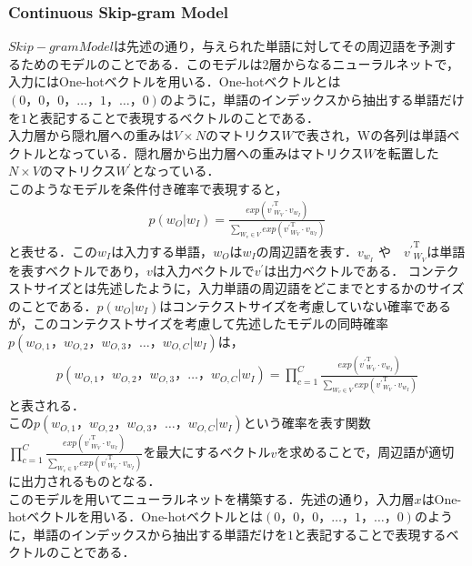 \subsubsection{Continuous Skip-gram Model}
\label{tech:skipgram}
$ Skip-gram Model $は先述の通り，与えられた単語に対してその周辺語を予測するためのモデルのことである．このモデルは2層からなるニューラルネットで，入力にはOne-hotベクトルを用いる．One-hotベクトルとは$ (0，0，0， \ldots ，1， \ldots ，0) $のように，単語のインデックスから抽出する単語だけを$ 1 $と表記することで表現するベクトルのことである．\\
入力層から隠れ層への重みは$ V \times N $のマトリクス$ W $で表され，Wの各列は単語ベクトルとなっている．隠れ層から出力層への重みはマトリクス$ W $を転置した$ N \times V $のマトリクス$ W^{\prime} $となっている．\\
このようなモデルを条件付き確率で表現すると，
\begin{align}
p(w_{O}|w_{I}) = \frac{exp({{v^{\prime}}^{\mathrm{T}}_{W_{V}}} \cdot v_{w_{I}})}{\sum_{W_{v} \in{V}}exp({{v^{\prime}}^{\mathrm{T}}_{W_{V}}} \cdot v_{w_{I}})} \nonumber
\end{align}
と表せる．この$ w_{I} $は入力する単語，$ w_{O} $は$ w_{I} $の周辺語を表す．$ v_{w_{I}} $ や　$ {v^{\prime}}^{\mathrm{T}}_{W_{V}} $は単語を表すベクトルであり，$ v $は入力ベクトルで$ v^{\prime} $は出力ベクトルである．
コンテクストサイズとは先述したように，入力単語の周辺語をどこまでとするかのサイズのことである．$ p(w_{O}|w_{I}) $はコンテクストサイズを考慮していない確率であるが，このコンテクストサイズを考慮して先述したモデルの同時確率$ p(w_{O,1}，w_{O,2}，w_{O,3}， \ldots ，w_{O,C}|w_{I}) $は，
\begin{align}
p(w_{O,1}，w_{O,2}，w_{O,3}， \ldots ，w_{O,C}|w_{I}) = \prod_{c=1}^{C} \frac{exp({{v^{\prime}}^{\mathrm{T}}_{W_{V}}} \cdot v_{w_{I}})}{\sum_{W_{v} \in{V}}exp({{v^{\prime}}^{\mathrm{T}}_{W_{V}}} \cdot v_{w_{I}})} \nonumber
\end{align}
と表される．\\
この$ p(w_{O,1}，w_{O,2}，w_{O,3}， \ldots ，w_{O,C}|w_{I}) $という確率を表す関数$ \prod_{c=1}^{C} \frac{exp({{v^{\prime}}^{\mathrm{T}}_{W_{V}}} \cdot v_{w_{I}})}{\sum_{W_{v} \in{V}}exp({{v^{\prime}}^{\mathrm{T}}_{W_{V}}} \cdot v_{w_{I}})} $を最大にするベクトル$ v $を求めることで，周辺語が適切に出力されるものとなる．\\
このモデルを用いてニューラルネットを構築する．先述の通り，入力層$ x $はOne-hotベクトルを用いる．One-hotベクトルとは$ (0，0，0， \ldots ，1， \ldots ，0) $のように，単語のインデックスから抽出する単語だけを$ 1 $と表記することで表現するベクトルのことである．\\

